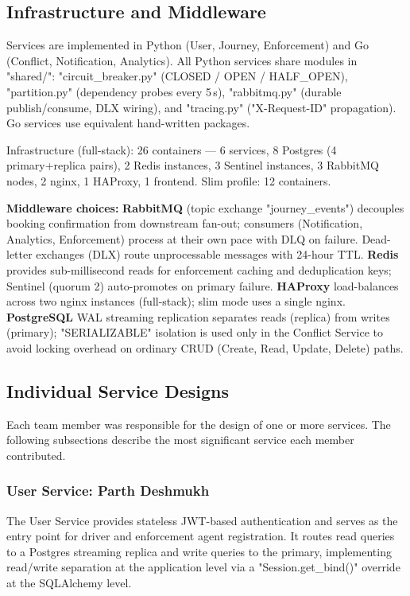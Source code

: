 \documentclass[11pt,a4paper]{article}
\begin{document}
 
\subsection{Infrastructure and Middleware}

Services are implemented in Python (User, Journey, Enforcement) and Go (Conflict, Notification, Analytics). All Python services share modules in "shared/": "circuit\_breaker.py" (CLOSED / OPEN / HALF\_OPEN), "partition.py" (dependency probes every 5\,s), "rabbitmq.py" (durable publish/consume, DLX wiring), and "tracing.py" ("X-Request-ID" propagation). Go services use equivalent hand-written packages.

Infrastructure (full-stack): 26 containers — 6 services, 8 Postgres (4 primary+replica pairs), 2 Redis instances, 3 Sentinel instances, 3 RabbitMQ nodes, 2 nginx, 1 HAProxy, 1 frontend. Slim profile: 12 containers.

\textbf{Middleware choices:} \textbf{RabbitMQ} (topic exchange "journey\_events") decouples booking confirmation from downstream fan-out; consumers (Notification, Analytics, Enforcement) process at their own pace with DLQ on failure. Dead-letter exchanges (DLX) route unprocessable messages with 24-hour TTL. \textbf{Redis} provides sub-millisecond reads for enforcement caching and deduplication keys; Sentinel (quorum 2) auto-promotes on primary failure. \textbf{HAProxy} load-balances across two nginx instances (full-stack); slim mode uses a single nginx. \textbf{PostgreSQL} WAL streaming replication separates reads (replica) from writes (primary); "SERIALIZABLE" isolation is used only in the Conflict Service to avoid locking overhead on ordinary CRUD (Create, Read, Update, Delete) paths.

\subsection{Individual Service Designs}
 
Each team member was responsible for the design of one or more services. The following subsections describe the most significant service each member contributed.
 
\subsubsection{User Service: Parth Deshmukh}
 
The User Service provides stateless JWT-based authentication and serves as the entry point for driver and enforcement agent registration. It routes read queries to a Postgres streaming replica and write queries to the primary, implementing read/write separation at the application level via a "Session.get\_bind()" override at the SQLAlchemy level.
\end{document}
